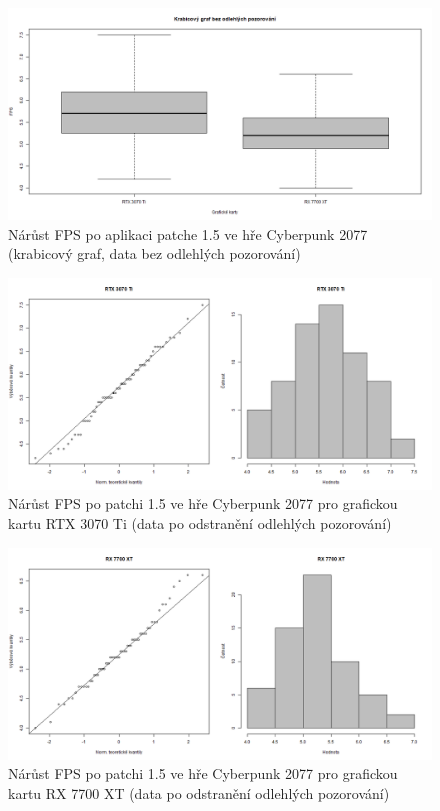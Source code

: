 \begin{figure}[h!]
    \centering
    \includegraphics[width=1.00\textwidth]{assets/boxplot_without_outliers.png}
    \caption{ Nárůst FPS po aplikaci patche 1.5 ve hře Cyberpunk 2077 (krabicový graf, data bez odlehlých pozorování) }
    \label{fig:boxplot_without_outliers}
\end{figure}



\begin{figure}[h!]
    \centering
    \includegraphics[width=1.10\textwidth]{assets/combined_qq_histogram_rtx3070ti.png}
    \caption{Nárůst FPS po patchi 1.5 ve hře Cyberpunk 2077 pro grafickou kartu RTX 3070 Ti (data po
    odstranění odlehlých pozorování)}
    \label{fig:qq_graph_histogram_rtx_3070_ti}
\end{figure}


\begin{figure}[h!]
    \centering
    \includegraphics[width=1.10\textwidth]{assets/combined_qq_histogram_rx7700xt.png}
    \caption{Nárůst FPS po patchi 1.5 ve hře Cyberpunk 2077 pro grafickou kartu RX 7700 XT (data po
    odstranění odlehlých pozorování)}
    \label{fig:qq_graph_histogram_rx7700xt}
\end{figure}





